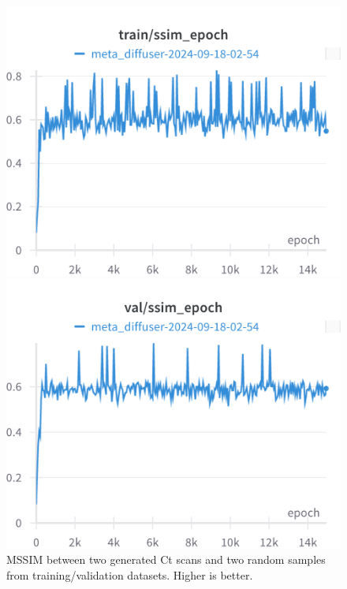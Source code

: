 \begin{figure}[H]
\includegraphics[width=\linewidth]{detailed_engineering/Meta Diffusion/charts/train_ssim_epoch.png}

\endminipage\hfill
{}
\includegraphics[width=\linewidth]{detailed_engineering/Meta Diffusion/charts/val_ssim_epoch.png}

\endminipage
\caption{MSSIM between two generated Ct scans and two random samples from training/validation datasets. Higher is better.}
\end{figure}

